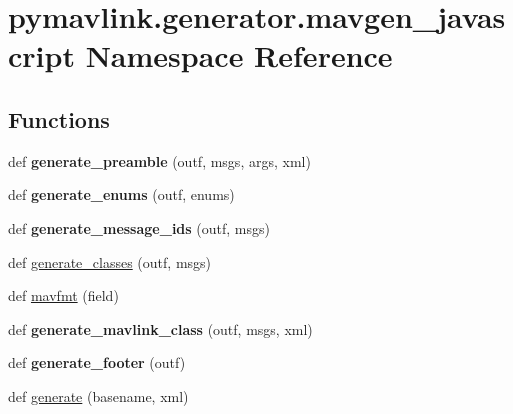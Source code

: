 \hypertarget{namespacepymavlink_1_1generator_1_1mavgen__javascript}{}\section{pymavlink.\+generator.\+mavgen\+\_\+javascript Namespace Reference}
\label{namespacepymavlink_1_1generator_1_1mavgen__javascript}
\subsection*{Functions}
\begin{DoxyCompactItemize}
\item 
\mbox{\label{namespacepymavlink_1_1generator_1_1mavgen__javascript_ad1cc83701bb043630ad79b970137e84c}} 
def {\bfseries generate\+\_\+preamble} (outf, msgs, args, xml)
\item 
\mbox{\label{namespacepymavlink_1_1generator_1_1mavgen__javascript_aee21c87a4dc8fd18e142518307140e54}} 
def {\bfseries generate\+\_\+enums} (outf, enums)
\item 
\mbox{\label{namespacepymavlink_1_1generator_1_1mavgen__javascript_a4b37442e2192201d57be9181ec5743dc}} 
def {\bfseries generate\+\_\+message\+\_\+ids} (outf, msgs)
\item 
def \hyperlink{namespacepymavlink_1_1generator_1_1mavgen__javascript_aa0aa15fc819656c01cf8decc8f7ace6a}{generate\+\_\+classes} (outf, msgs)
\item 
def \hyperlink{namespacepymavlink_1_1generator_1_1mavgen__javascript_a5193d9a9ee0c09b4d88d2b34381d81fe}{mavfmt} (field)
\item 
\mbox{\label{namespacepymavlink_1_1generator_1_1mavgen__javascript_adca854dd288385d5e7da8b833425388e}} 
def {\bfseries generate\+\_\+mavlink\+\_\+class} (outf, msgs, xml)
\item 
\mbox{\label{namespacepymavlink_1_1generator_1_1mavgen__javascript_a983f5d7b44460d0aa4467462f01a31cb}} 
def {\bfseries generate\+\_\+footer} (outf)
\item 
def \hyperlink{namespacepymavlink_1_1generator_1_1mavgen__javascript_a91d9cd83428167ae922bb2bf9c97f811}{generate} (basename, xml)
\end{DoxyCompactItemize}
